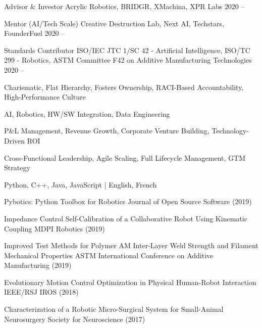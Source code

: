 \documentclass[11pt, letterpaper]{awesome-cv}
\begin{document}
\begin{cvhonors}

\cvhonor
{Advisor \& Investor}
{Acrylic Robotics, BRIDGR, XMachina, XPR Labs}
{}
{2020 -- }

\cvhonor
{Mentor (AI/Tech Scale)}
{Creative Destruction Lab, Next AI, Techstars, FounderFuel}
{}
{2020 -- }

\cvhonor
{Standards Contributor}
{ISO/IEC JTC 1/SC 42 - Artificial Intelligence,
ISO/TC 299 - Robotics,
ASTM Committee F42 on Additive Manufacturing Technologies}
{}
{2020 -- }

\end{cvhonors}

\begin{cvskills}

{Charismatic, Flat Hierarchy, Fosters Ownership, RACI-Based Accountability, High-Performance Culture}

{AI, Robotics, HW/SW Integration, Data Engineering}

{P\&L Management, Revenue Growth, Corporate Venture Building, Technology-Driven ROI}

{Cross-Functional Leadership, Agile Scaling, Full Lifecycle Management, GTM Strategy}

{Python, C++, Java, JavaScript | English, French}

\end{cvskills}

\begin{cvhonors}

\cvhonor
{Pybotics: Python Toolbox for Robotics}
{Journal of Open Source Software (2019)}
{}
{}

\cvhonor
{Impedance Control Self-Calibration of a Collaborative Robot Using Kinematic Coupling}
{MDPI Robotics (2019)}
{}
{}

\cvhonor
{Improved Test Methods for Polymer AM Inter-Layer Weld Strength and Filament Mechanical Properties}
{ASTM International Conference on Additive Manufacturing (2019)}
{}
{}

\cvhonor
{Evolutionary Motion Control Optimization in Physical Human-Robot Interaction}
{IEEE/RSJ IROS (2018)}
{}
{}

\cvhonor
{Characterization of a Robotic Micro-Surgical System for Small-Animal Neurosurgery}
{Society for Neuroscience (2017)}
{}
{}

\end{cvhonors}
\end{document}
